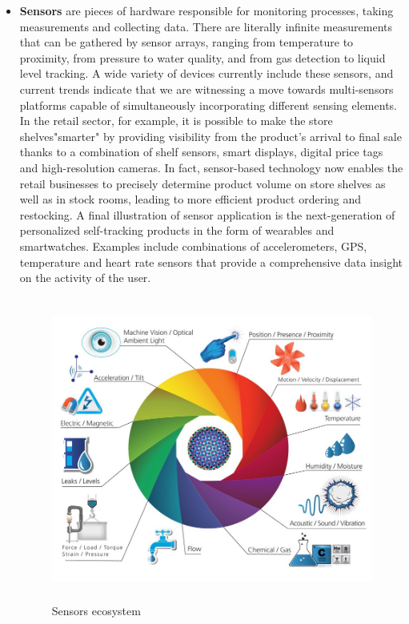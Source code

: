 \begin{itemize}
  \item \textbf{Sensors} are pieces of hardware responsible for monitoring processes, taking measurements and collecting data. There are literally infinite measurements that can be gathered by sensor arrays, ranging from temperature to proximity, from pressure to water quality, and from gas detection to liquid level tracking. A wide variety of devices currently include these sensors, and current trends indicate that we are witnessing a move towards multi-sensors platforms capable of simultaneously incorporating different sensing elements. In the retail sector, for example, it is possible to make the store shelves"smarter" by providing visibility from the product's arrival to final sale thanks to a combination of shelf sensors, smart displays, digital price tags and high-resolution cameras. In fact, sensor-based technology now enables the retail businesses to precisely determine product volume on store shelves as well as in stock rooms, leading to more efficient product ordering and restocking. A final illustration of sensor application is the next-generation of personalized self-tracking products in the form of wearables and smartwatches. Examples include combinations of accelerometers, GPS, temperature and heart rate sensors that provide a comprehensive data insight on the activity of the user.   
  

  \vspace{0.5cm}
  \begin{figure}[htbp]
    \centering
      \includegraphics[height=10cm]{images/iot-sensors.jpg}
    \caption{Sensors ecosystem}
    \label{fig:sensors}
  \end{figure}
  \vspace{0.5cm}

\end{itemize} 

